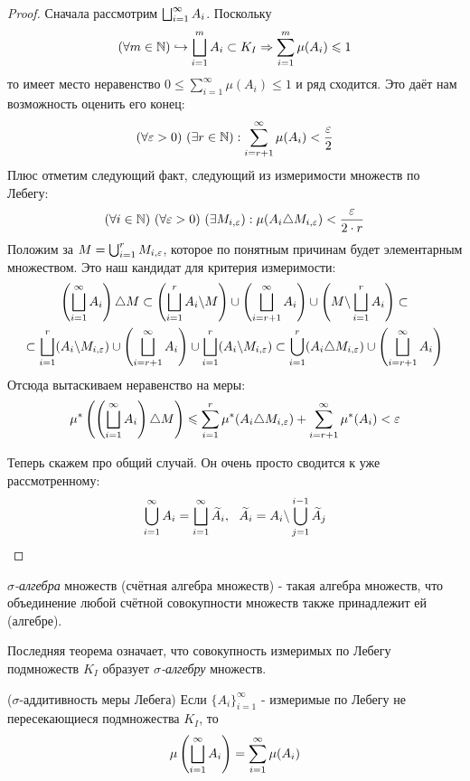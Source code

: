 \begin{proof}
	Сначала рассмотрим $\bigsqcup_{i = 1}^\infty A_i$. Поскольку
	\[
		(\forall m \in \mathbb{N}) \hookrightarrow \bigsqcup_{i = 1}^m A_i \subset K_I \Rightarrow \sum_{i = 1}^m \mu(A_i) \leqslant 1
	\]
	то имеет место неравенство $0 \le \sum_{i = 1}^\infty \mu(A_i)\le 1$ и ряд сходится. Это даёт нам возможность оценить его конец:
	\[
		(\forall \varepsilon > 0)\ (\exists r \in \mathbb{N}) : \sum_{i = r + 1}^\infty \mu(A_i) < \frac{\varepsilon}{2}
	\]
	Плюс отметим следующий факт, следующий из измеримости множеств по Лебегу:
	\[
		(\forall i \in \N)\ (\forall \eps > 0)\ (\exists M_{i, \eps}) : \mu(A_i \tr M_{i, \eps}) < \frac{\eps}{2 \cdot r}
	\]
	Положим за $M = \bigcup_{i = 1}^r M_{i, \varepsilon}$, которое по понятным причинам будет элементарным множеством. Это наш кандидат для критерия измеримости:
	\begin{multline*}
		\left(\bigsqcup_{i = 1}^\infty A_i\right) \triangle M \subset \left(\bigsqcup_{i = 1}^r A_i \backslash M\right) \cup \left(\bigsqcup_{i = r + 1}^\infty A_i\right) \cup \left(M \backslash \bigsqcup_{i = 1}^r A_i\right) \subset
		\\
		\subset \bigsqcup_{i = 1}^r (A_i \backslash M_{i, \varepsilon}) \cup \left(\bigsqcup_{i = r + 1}^\infty A_i\right) \cup \bigsqcup_{i = 1}^r (A_i \backslash M_{i, \varepsilon}) \subset \bigcup_{i = 1}^r (A_i \triangle M_{i, \varepsilon}) \cup \left(\bigsqcup_{i = r + 1}^\infty A_i\right)
	\end{multline*}
	Отсюда вытаскиваем неравенство на меры:
	\[
		\mu^* \left(\left(\bigsqcup_{i = 1}^\infty A_i\right) \triangle M\right) \leqslant \sum_{i = 1}^r \mu^* (A_i \triangle M_{i, \varepsilon}) + \sum_{i = r + 1}^\infty \mu^* (A_i) < \varepsilon
	\]
	
	Теперь скажем про общий случай. Он очень просто сводится к уже рассмотренному:
	\[
		\bigcup_{i = 1}^\infty A_i = \bigsqcup_{i = 1}^\infty \widetilde{A}_i,\ \ \widetilde{A}_i = A_i \backslash \bigcup_{j = 1}^{i - 1} \widetilde{A}_j
	\]
\end{proof}

\begin{definition}
	\textit{$\sigma$-алгебра} множеств (счётная алгебра множеств) - такая алгебра множеств, что объединение любой счётной совокупности множеств также принадлежит ей (алгебре).	
\end{definition}

\begin{corollary}
	Последняя теорема означает, что совокупность измеримых по Лебегу подмножеств $K_I$ образует \textit{$\sigma$-алгебру} множеств.
\end{corollary}

\begin{theorem} ($\sigma$-аддитивность меры Лебега)
	Если $\{A_i\}_{i = 1}^\infty$ - измеримые по Лебегу не пересекающиеся подмножества $K_I$, то
	\[
		\mu\left(\bigsqcup_{i = 1}^\infty A_i\right) = \sum_{i = 1}^\infty \mu(A_i)
	\]
\end{theorem}

